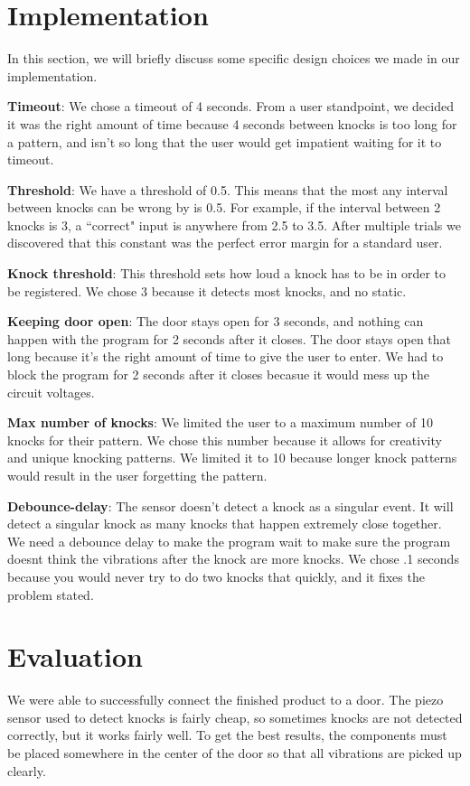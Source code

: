 \documentclass[11pt]{article}			%
\begin{document}
\section{Implementation}

In this section, we will briefly discuss some specific design choices we made in our implementation.

\textbf{Timeout}: We chose a timeout of 4 seconds. From a user standpoint, we decided it was the right amount of time because 4 seconds between knocks is too long for a pattern, and isn't so long that the user would get impatient waiting for it to timeout.

\textbf{Threshold}: We have a threshold of 0.5. This means that the most any interval between knocks can be wrong by is 0.5. For example, if the interval between 2 knocks is 3, a ``correct" input is anywhere from 2.5 to 3.5. After multiple trials we discovered that this constant was the perfect error margin for a standard user.

\textbf{Knock threshold}: This threshold sets how loud a knock has to be in order to be registered. We chose 3 because it detects most knocks, and no static.

\textbf{Keeping door open}: The door stays open for 3 seconds, and nothing can happen with the program for 2 seconds after it closes. The door stays open that long because it's the right amount of time to give the user to enter. We had to block the program for 2 seconds after it closes becasue it would mess up the circuit voltages.

\textbf{Max number of knocks}: We limited the user to a maximum number of 10 knocks for their pattern. We chose this number because it allows for creativity and unique knocking patterns. We limited it to 10 because longer knock patterns would result in the user forgetting the pattern.

\textbf{Debounce-delay}: The sensor doesn't detect a knock as a singular event. It will detect a singular knock as many knocks that happen 
extremely close together. We need a debounce delay to make the program wait to make sure the program doesnt think the vibrations after the knock are more knocks. We chose .1 seconds because you would never try to do two knocks that quickly, and it fixes the problem stated.


\section{Evaluation}
We were able to successfully connect the finished product to a door.  The piezo sensor used to detect knocks is fairly cheap, so sometimes knocks are not detected correctly, but it works fairly well.  To get the best results, the components must be placed somewhere in the center of the door so that all vibrations are picked up clearly.  
\end{document}
